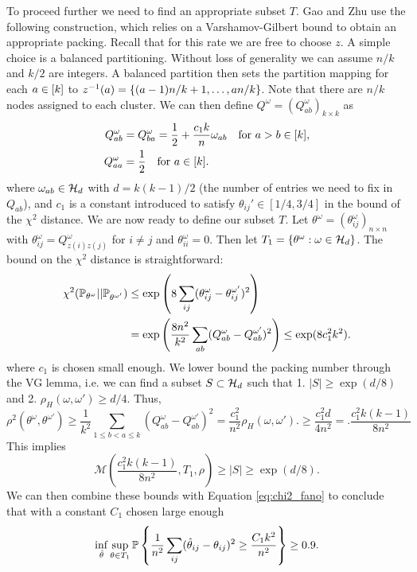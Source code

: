 \documentclass[11pt]{article}
\begin{document}
To proceed further we need to find an appropriate subset $T$. Gao and Zhu use the following construction, which relies on a Varshamov-Gilbert bound to obtain an appropriate packing. Recall that for this rate we are free to choose $z$. A simple choice is a balanced partitioning. Without loss of generality we can assume $n / k$ and $k / 2$ are integers. A balanced partition then sets the partition mapping for each $a \in \lbrack k\rbrack$ to $z^{-1}(a) = \{(a-1)n/k + 1, \dots, an/k\}$. Note that there are $n/k$ nodes assigned to each cluster. We can then define $Q^{\omega} = (Q_{ab}^{\omega})_{k \times k}$ as
\begin{equation}
\begin{aligned}
Q^{\omega}_{ab} &= Q^{\omega}_{ba} = \frac{1}{2} + \frac{c_1 k}{n} \omega_{ab} \quad \text{for } a > b \in \lbrack k\rbrack, \\
Q_{aa}^{\omega} &= \frac{1}{2} \quad \text{for } a \in \lbrack k\rbrack.
\end{aligned}
\end{equation}
where $\omega_{ab} \in \mathcal{H}_d$ with $d = k(k-1)/2$ (the number of entries we need to fix in $Q_{ab}$), and $c_1$ is a constant introduced to satisfy $\theta_{ij}' \in [1/4, 3/4]$ in the bound of the $\chi^2$ distance. We are now ready to define our subset $T$. Let $\theta^{\omega} = (\theta_{ij}^{\omega})_{n \times n}$ with $\theta_{ij}^{\omega} = Q_{z(i)z(j)}^{\omega}$ for $i \neq j$ and $\theta_{ii}^{\omega} = 0$. Then let $T_1 = \{\theta^{\omega} : \omega \in \mathcal{H}_d\}$. The bound on the $\chi^2$ distance is straightforward:
\begin{equation}
\begin{aligned}
\chi^2(\mathbb{P}_{\theta^{\omega}} || \mathbb{P}_{\theta^{\omega'}}) &\leq \exp\left(8 \sum_{ij} (\theta_{ij}^{\omega} - \theta_{ij}^{\omega'})^2\right) \\
&= \exp\left(\frac{8 n^2}{k^2} \sum_{ab} (Q_{ab}^{\omega} - Q_{ab}^{\omega'})^2\right)
\leq \exp(8 c_1^2 k^2).
\end{aligned}
\end{equation}
where $c_1$ is chosen small enough. We lower bound the packing number through the VG lemma, i.e.
we can find a subset $S \subset \mathcal{H}_d$ such that 1. $|S| \geq \exp(d/8)$ and 2. $\rho_{H}(\omega, \omega') \geq d/4$. Thus,
\begin{equation}
\rho^2(\theta^{\omega}, \theta^{\omega'}) \geq \frac{1}{k^2} \sum_{1 \leq b < a \leq k} (Q_{ab}^{\omega} - Q_{ab}^{\omega'})^2 = \frac{c_1^2}{n^2} \rho_{H}(\omega, \omega').\geq \frac{c_1^2 d}{4 n^2} = .\frac{c_1^2 k(k-1)}{8 n^2}
\end{equation}
This implies
\begin{equation}
\mathcal{M}\left(\frac{c_1^2 k(k-1)}{8 n^2}, T_1, \rho\right) \geq |S| \geq \exp(d/8).
\end{equation}
We can then combine these bounds with Equation \ref{eq:chi2_fano} to conclude that with a constant $C_1$ chosen large enough
\begin{equation}
\inf_{\hat{\theta}} \sup_{\theta \in T_1} \mathbb{P} \left\{\frac{1}{n^2} \sum_{ij} (\hat{\theta}_{ij} - \theta_{ij})^2 \geq \frac{C_1 k^2}{n^2} \right\} \geq 0.9.
\end{equation}
\end{document}
